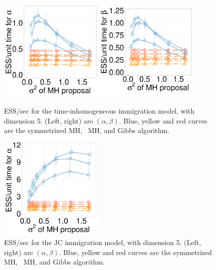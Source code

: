 	\begin{figure}	
  \centering
  \begin{minipage}[!hp]{0.65\linewidth}
  \centering
    \includegraphics [width=0.44\textwidth, angle=0]{figs/new_whole_exp_figs/cq_alpha_dim5.pdf}
    \includegraphics [width=0.44\textwidth, angle=0]{figs/new_whole_exp_figs/cq_beta_dim5.pdf}
  \end{minipage}
  \begin{minipage}[!hp]{0.33\linewidth}
    \caption{ESS/sec for the time-inhomogeneous immigration model, with 
      dimension 5. (Left, right) are $(\alpha, \beta)$. Blue, yellow and red curves are the symmetrized MH,
  \naive\ MH, and Gibbs algorithm.}
     \label{fig:ESS_pc_55}
  \end{minipage}

  \begin{minipage}[!hp]{0.65\linewidth}
  \centering
    \includegraphics [width=0.44\textwidth, angle=0]{figs/new_whole_exp_figs/jc_alpha.pdf}
  \end{minipage}
  \begin{minipage}[!hp]{0.33\linewidth}
    \caption{ESS/sec for the JC immigration model, with 
      dimension 5. (Left, right) are $(\alpha, \beta)$. Blue, yellow and red curves are the symmetrized MH,
  \naive\ MH, and Gibbs algorithm.}
     \label{fig:ESS_pc_55}
  \end{minipage}



\end{figure}
